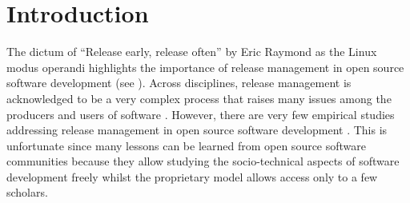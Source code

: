 \documentclass[dvipsnames]{bmcart}
\theoremstyle{definition}
\begin{document}
\begin{frontmatter}
\begin{fmbox}

\begin{artnotes}
\end{artnotes}

\end{fmbox}%







\begin{abstractbox}



%

\end{abstractbox}

\end{frontmatter}



\section{Introduction}

The dictum of ``Release early, release often'' by Eric Raymond as the Linux modus operandi \cite{raymond_cathedral_1999,raymond2001cathedral}
highlights the importance of release management in open source software development (see \cite{Zhao_et_al2000,aberdour2007achieving,michlmayr2015and}).  
Across disciplines, release management is acknowledged to be a very complex process that raises many issues among the producers and users of software 
\cite{barqawi_et_al2016,khomh2015understanding,choudhary2015research,Wright_et_al2012}.  However, there are very few empirical studies addressing 
release management in open source software development \cite{michlmayr2015and,Poo-Caamano2017}. 
%
This is unfortunate since many lessons can be learned from open source software communities \cite{O'Reilly_1999,spinellis2004open,fitzgerald2011open} because they allow studying the socio-technical aspects of software development freely whilst the proprietary model allows access only to a few scholars.  
\end{document}

